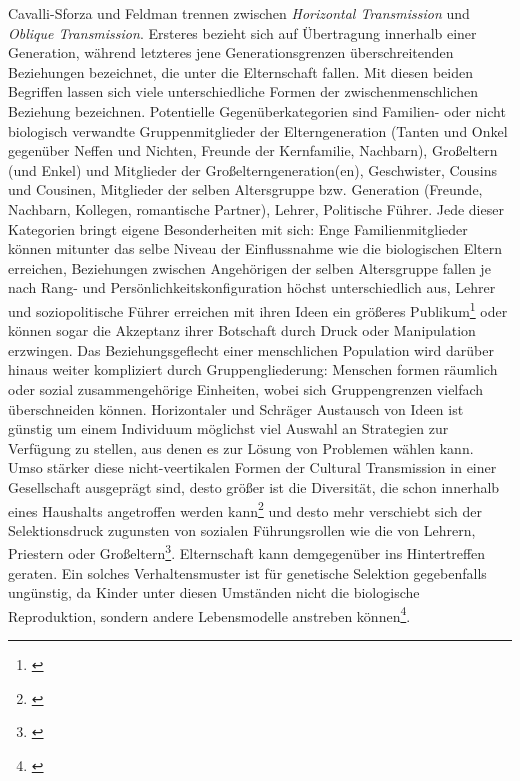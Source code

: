 \documentclass[openany,twoside,twocolumn]{book}
\let\rmarkdownfootnote\footnote%
\def\footnote{\protect\rmarkdownfootnote}
\begin{document}
Cavalli-Sforza und Feldman trennen zwischen \emph{Horizontal
Transmission} und \emph{Oblique Transmission}. Ersteres bezieht sich auf
Übertragung innerhalb einer Generation, während letzteres jene
Generationsgrenzen überschreitenden Beziehungen bezeichnet, die unter
die Elternschaft fallen. Mit diesen beiden Begriffen lassen sich viele
unterschiedliche Formen der zwischenmenschlichen Beziehung bezeichnen.
Potentielle Gegenüberkategorien sind Familien- oder nicht biologisch
verwandte Gruppenmitglieder der Elterngeneration (Tanten und Onkel
gegenüber Neffen und Nichten, Freunde der Kernfamilie, Nachbarn),
Großeltern (und Enkel) und Mitglieder der Großelterngeneration(en),
Geschwister, Cousins und Cousinen, Mitglieder der selben Altersgruppe
bzw. Generation (Freunde, Nachbarn, Kollegen, romantische Partner),
Lehrer, Politische Führer. Jede dieser Kategorien bringt eigene
Besonderheiten mit sich: Enge Familienmitglieder können mitunter das
selbe Niveau der Einflussnahme wie die biologischen Eltern erreichen,
Beziehungen zwischen Angehörigen der selben Altersgruppe fallen je nach
Rang- und Persönlichkeitskonfiguration höchst unterschiedlich aus,
Lehrer und soziopolitische Führer erreichen mit ihren Ideen ein größeres
Publikum\footnote{\textcite{fogarty_evolution_2011}} oder können sogar
die Akzeptanz ihrer Botschaft durch Druck oder Manipulation erzwingen.
Das Beziehungsgeflecht einer menschlichen Population wird darüber hinaus
weiter kompliziert durch Gruppengliederung: Menschen formen räumlich
oder sozial zusammengehörige Einheiten, wobei sich Gruppengrenzen
vielfach überschneiden können. Horizontaler und Schräger Austausch von
Ideen ist günstig um einem Individuum möglichst viel Auswahl an
Strategien zur Verfügung zu stellen, aus denen es zur Lösung von
Problemen wählen kann. Umso stärker diese nicht-veertikalen Formen der
Cultural Transmission in einer Gesellschaft ausgeprägt sind, desto
größer ist die Diversität, die schon innerhalb eines Haushalts
angetroffen werden kann\footnote{\textcite{shennan_genes_2002}} und
desto mehr verschiebt sich der Selektionsdruck zugunsten von sozialen
Führungsrollen wie die von Lehrern, Priestern oder Großeltern\footnote{\textcite{macdonald_subsistence_1998}}.
Elternschaft kann demgegenüber ins Hintertreffen geraten. Ein solches
Verhaltensmuster ist für genetische Selektion gegebenfalls ungünstig, da
Kinder unter diesen Umständen nicht die biologische Reproduktion,
sondern andere Lebensmodelle anstreben können\footnote{\textcite{smith_cultural_1992}}.
\end{document}
